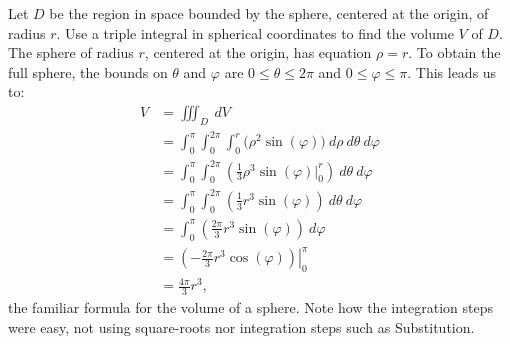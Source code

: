 \begin{example}\label{ex_spherical2}
Let $D$ be the region in space bounded by the sphere, centered at the origin, of radius $r$. Use a triple integral in spherical coordinates to find the volume $V$ of $D$.
\solution
The sphere of radius $r$, centered at the origin, has equation $\rho = r$. To obtain the full sphere, the bounds on $\theta$ and $\varphi$ are $0\leq \theta \leq 2\pi$ and $0 \leq \varphi \leq \pi$. This leads us to:
\begin{align*}
V &= \iiint_D\ dV\\
	&= \int_0^{\pi}\int_0^{2\pi}\int_0^r\bigl(\rho^2\sin(\varphi)\bigr)\ d\rho\ d\theta\ d\varphi\\
	&= \int_0^\pi\int_0^{2\pi}\left(\frac13\rho^3\sin(\varphi)\Big|_0^r\right)\ d\theta\ d\varphi\\
	&= \int_0^\pi\int_0^{2\pi} \left(\frac13r^3\sin(\varphi)\right)\ d\theta\ d\varphi\\
	&= \int_0^\pi \left(\frac{2\pi}3r^3\sin(\varphi)\right)\ d\varphi\\
	&= \left.\left(-\frac{2\pi}3r^3\cos(\varphi)\right)\right|_0^{\pi}\\
	&= \frac{4\pi}3r^3,
\end{align*}
the familiar formula for the volume of a sphere. Note how the integration steps were easy, not using square-roots nor integration steps such as Substitution.
\end{example}


